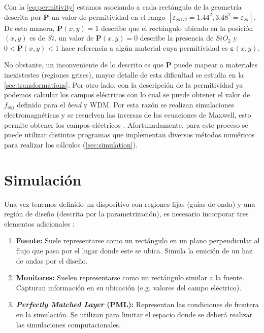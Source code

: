 Con la \autoref{eq:permitivity} estamos asociando a cada rectángulo de la geometría descrita por
$\boldsymbol{P}$ un valor de permitividad en el rango 
$[\varepsilon_{SiO2} = 1.44^2, 3.48^2 = \varepsilon_{Si}]$.
De esta manera, $\boldsymbol{P}(x, y) = 1$ describe que el rectángulo ubicado en la posición $(x, y)$ es de
$Si$,
un valor de $\boldsymbol{P}(x, y) = 0$ describe la presencia de $SiO_2$ y 
$0 < \boldsymbol{P}(x, y) < 1$ hace referencia
a algún material cuya permitividad es $\boldsymbol{\varepsilon}(x, y)$.

No obstante, un inconveniente de lo descrito es que $\boldsymbol{P}$ puede mapear a materiales inexistestes
(regiones grises),
mayor detalle de esta dificultad se estudia
en la \autoref{sec:transformations}.
Por otro lado, con la descripción de la permitividad ya podemos calcular los campos eléctricos con lo
cual se puede obtener el valor de $f_{obj}$ definido para el \emph{bend} y WDM.
Por esta razón se realizan simulaciones electromagnéticas y se resuelven las inversas de las 
ecuaciones de Maxwell, esto permite obtener los campos eléctricos \citep{Su2020}.
Afortunadamente, para este proceso se puede utilizar distintos programas que implementan diversos 
métodos numéricos para realizar los cálculos (\autoref{sec:simulation}).

\section{Simulación}\label{sec:simulation}

Una vez tenemos definido un dispositivo con regiones fijas (guías de onda) y una
región de diseño (descrita por la parametrización), es necesario incorporar
tres elementos adicionales \citep{Oskooi2010, Su2020}:

\begin{enumerate}

  \item \textbf{Fuente:} Suele representarse como un rectángulo en un plano perpendicular al flujo
    que pasa por el lugar donde este se ubica. Simula la emición de un haz de ondas por el diseño.

  \item \textbf{Monitores:} Suelen representarse como un rectángulo similar a la fuente.
    Capturan información en su ubicación (e.g. valores del campo eléctrico).

  \item \textbf{\emph{Perfectly Matched Layer} (PML):} Representan las condiciones de frontera en la simulación. 
    Se utilizan para limitar el espacio donde se deberá realizar las simulaciones computacionales.

\end{enumerate}

